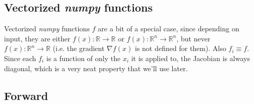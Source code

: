 \documentclass[parskip,paper=a4,11pt,headsepline]{scrartcl}
\newcommand{\ve}[1]{\ensuremath{\bm{\mathit{#1}}}}
\newcommand{\ra}{\ensuremath{\rightarrow}}
\newcommand{\soft}[1]{\textsl{#1}\xspace}
\newcommand{\numpy}{\soft{numpy}}
\begin{document}
\subsection{Vectorized \numpy functions}

Vectorized \numpy functions $f$ are a bit of a special case, since depending on
input, they are either $f(x):\mathbb R\ra\mathbb R$ or $\ve f(\ve x):\mathbb
R^n\ra\mathbb R^n$, but never $f(\ve x): \mathbb R^n \ra \mathbb R$ (i.e. the
gradient $\nabla f(\ve x)$ is not defined for them). Also $f_i\equiv f$. Since
each $f_i$ is a function of only the $x_i$ it is applied to, the Jacobian is
always diagonal, which is a very neat property that we'll use later.

\subsection{Forward}
\end{document}
